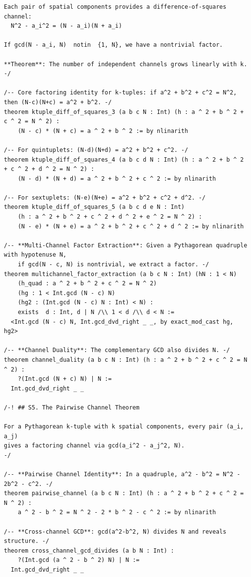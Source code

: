 \documentclass[11pt,openright,twoside]{book}
\theoremstyle{definition}
\begin{document}
\begin{lstlisting}[style=lean]
Each pair of spatial components provides a difference-of-squares channel:
  N^2 - a_i^2 = (N - a_i)(N + a_i)

If gcd(N - a_i, N)  notin  {1, N}, we have a nontrivial factor.

**Theorem**: The number of independent channels grows linearly with k.
-/

/-- Core factoring identity for k-tuples: if a^2 + b^2 + c^2 = N^2, then (N-c)(N+c) = a^2 + b^2. -/
theorem ktuple_diff_of_squares_3 (a b c N : Int) (h : a ^ 2 + b ^ 2 + c ^ 2 = N ^ 2) :
    (N - c) * (N + c) = a ^ 2 + b ^ 2 := by nlinarith

/-- For quintuplets: (N-d)(N+d) = a^2 + b^2 + c^2. -/
theorem ktuple_diff_of_squares_4 (a b c d N : Int) (h : a ^ 2 + b ^ 2 + c ^ 2 + d ^ 2 = N ^ 2) :
    (N - d) * (N + d) = a ^ 2 + b ^ 2 + c ^ 2 := by nlinarith

/-- For sextuplets: (N-e)(N+e) = a^2 + b^2 + c^2 + d^2. -/
theorem ktuple_diff_of_squares_5 (a b c d e N : Int)
    (h : a ^ 2 + b ^ 2 + c ^ 2 + d ^ 2 + e ^ 2 = N ^ 2) :
    (N - e) * (N + e) = a ^ 2 + b ^ 2 + c ^ 2 + d ^ 2 := by nlinarith

/-- **Multi-Channel Factor Extraction**: Given a Pythagorean quadruple with hypotenuse N,
    if gcd(N - c, N) is nontrivial, we extract a factor. -/
theorem multichannel_factor_extraction (a b c N : Int) (hN : 1 < N)
    (h_quad : a ^ 2 + b ^ 2 + c ^ 2 = N ^ 2)
    (hg : 1 < Int.gcd (N - c) N)
    (hg2 : (Int.gcd (N - c) N : Int) < N) :
    exists  d : Int, d | N /\\ 1 < d /\\ d < N :=
  <Int.gcd (N - c) N, Int.gcd_dvd_right _ _, by exact_mod_cast hg, hg2>

/-- **Channel Duality**: The complementary GCD also divides N. -/
theorem channel_duality (a b c N : Int) (h : a ^ 2 + b ^ 2 + c ^ 2 = N ^ 2) :
    ?(Int.gcd (N + c) N) | N :=
  Int.gcd_dvd_right _ _

/-! ## S5. The Pairwise Channel Theorem

For a Pythagorean k-tuple with k spatial components, every pair (a_i, a_j)
gives a factoring channel via gcd(a_i^2 - a_j^2, N).
-/

/-- **Pairwise Channel Identity**: In a quadruple, a^2 - b^2 = N^2 - 2b^2 - c^2. -/
theorem pairwise_channel (a b c N : Int) (h : a ^ 2 + b ^ 2 + c ^ 2 = N ^ 2) :
    a ^ 2 - b ^ 2 = N ^ 2 - 2 * b ^ 2 - c ^ 2 := by nlinarith

/-- **Cross-channel GCD**: gcd(a^2-b^2, N) divides N and reveals structure. -/
theorem cross_channel_gcd_divides (a b N : Int) :
    ?(Int.gcd (a ^ 2 - b ^ 2) N) | N :=
  Int.gcd_dvd_right _ _


\end{lstlisting}
\end{document}
